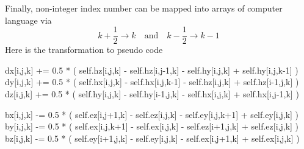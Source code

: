 Finally, non-integer index number can be mapped into arrays of computer language via
\begin{equation}
  k+\frac{1}{2}\rightarrow k\quad \mathrm{and} \quad
  k-\frac{1}{2}\rightarrow k-1
\end{equation}
Here is the transformation to pseudo code
\begin{code}
  dx[i,j,k] += 0.5 * ( self.hz[i,j,k] - self.hz[i,j-1,k] 
                     - self.hy[i,j,k] + self.hy[i,j,k-1] )
  dy[i,j,k] += 0.5 * ( self.hx[i,j,k] - self.hx[i,j,k-1] 
                     - self.hz[i,j,k] + self.hz[i-1,j,k] )
  dz[i,j,k] += 0.5 * ( self.hy[i,j,k] - self.hy[i-1,j,k] 
                     - self.hx[i,j,k] + self.hx[i,j-1,k] )
  
  bx[i,j,k] -= 0.5 * ( self.ez[i,j+1,k] - self.ez[i,j,k] 
                     - self.ey[i,j,k+1] + self.ey[i,j,k] )
  by[i,j,k] -= 0.5 * ( self.ex[i,j,k+1] - self.ex[i,j,k] 
                     - self.ez[i+1,j,k] + self.ez[i,j,k] )
  bz[i,j,k] -= 0.5 * ( self.ey[i+1,j,k] - self.ey[i,j,k] 
                     - self.ex[i,j+1,k] + self.ex[i,j,k] )
\end{code}




